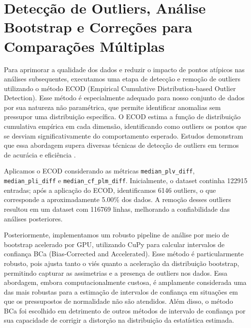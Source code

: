 \section{Detecção de Outliers, Análise Bootstrap e Correções para Comparações Múltiplas}

Para aprimorar a qualidade dos dados e reduzir o impacto de pontos atípicos nas análises subsequentes, executamos uma etapa de detecção e remoção de outliers utilizando o método ECOD (Empirical Cumulative Distribution-based Outlier Detection). Esse método é especialmente adequado para nosso conjunto de dados por sua natureza não paramétrica, que permite identificar anomalias sem pressupor uma distribuição específica. O ECOD estima a função de distribuição cumulativa empírica em cada dimensão, identificando como outliers os pontos que se desviam significativamente do comportamento esperado. Estudos demonstram que essa abordagem supera diversas técnicas de detecção de outliers em termos de acurácia e eficiência \cite{li2022}.

Aplicamos o ECOD considerando as métricas \texorpdfstring{\texttt{median\_plv\_diff}}{median_plv_diff}, \texorpdfstring{\texttt{median\_pli\_diff}}{median_pli_diff} e \texorpdfstring{\texttt{median\_cf\_plm\_diff}}{median_cf_plm_diff}. Inicialmente, o dataset continha 122915 entradas; após a aplicação do ECOD, identificamos 6146 outliers, o que corresponde a aproximadamente 5.00\% dos dados. A remoção desses outliers resultou em um dataset com 116769 linhas, melhorando a confiabilidade das análises posteriores.

Posteriormente, implementamos um robusto pipeline de análise por meio de bootstrap acelerado por GPU, utilizando CuPy para calcular intervalos de confiança BCa (Bias-Corrected and Accelerated). Esse método é particularmente robusto, pois ajusta tanto o viés quanto a aceleração da distribuição bootstrap, permitindo capturar as assimetrias e a presença de outliers nos dados. Essa abordagem, embora computacionalmente custosa, é amplamente considerada uma das mais robustas para a estimação de intervalos de confiança em situações em que os pressupostos de normalidade não são atendidos. Além disso, o método BCa foi escolhido em detrimento de outros métodos de intervalo de confiança por sua capacidade de corrigir a distorção na distribuição da estatística estimada.

